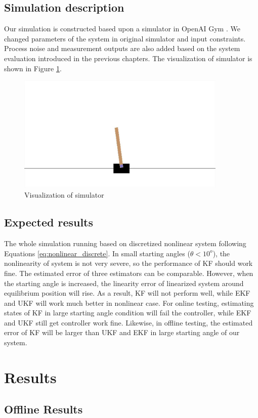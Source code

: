 \documentclass{article}
\begin{document}
\subsection{Simulation description}
Our simulation is constructed based upon a simulator in OpenAI Gym \cite{OpenAI}. We changed parameters of the system in original simulator and input constraints. Process noise and measurement outputs are also added based on the system evaluation introduced in the previous chapters. The visualization of simulator is shown in Figure \ref{fig:simulator}.
\begin{figure}
	\centering
	\includegraphics[width=10cm,keepaspectratio]{Simulator.jpg}
	\caption{Visualization of simulator}
	\label{fig:simulator}
\end{figure}
\subsection{Expected results}
The whole simulation running based on discretized nonlinear system following Equations \ref{eq:nonlinear_discrete}. In small starting angles ($\theta<10^o$), the nonlinearity of system is not very severe, so the performance of KF should work fine. The estimated error of three estimators can be comparable. However, when the starting angle is increased, the linearity error of linearized system around equilibrium position will rise. As a result, KF will not perform well, while EKF and UKF will work much better in nonlinear case. For online testing, estimating states of KF in large starting angle condition will fail the controller, while EKF and UKF still get controller work fine. Likewise, in offline testing, the estimated error of KF will be larger than UKF and EKF in large starting angle of our system.
\section{Results}
\subsection{Offline Results}
\end{document}
